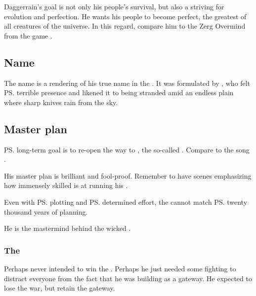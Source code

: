 Daggerrain's goal is not only his people's survival, but also a striving for evolution and perfection. He wants his people to become perfect, the greatest of all creatures of the universe. In this regard, compare him to the Zerg Overmind from the game \cite{VideoGame:Starcraft}.









\subsection{Name}
The name \Daggerrain{} is a rendering of his true name in the . 
It was formulated by \Semiza, who felt \ps{\Daggerrain}{} terrible presence and likened it to being stranded amid an endless plain where sharp knives rain from the sky.  









\subsection{Master plan}
\ps{\Daggerrain}{} long-term goal is to re-open the way to \Erebos, the so-called . Compare to the song . 

His master plan is brilliant and fool-proof. Remember to have scenes emphasizing how immensely skilled \Daggerrain{} is at running his . 

Even with \ps{\HriistD}{} plotting and \ps{\Ishnaruchaefir} determined effort, the \dragons{} cannot match \ps{\Daggerrain}{} twenty thousand years of planning. 

He is the mastermind behind the wicked . 





\subsubsection{The \firstbanewar}
Perhaps \Daggerrain{} never intended to win the \firstbanewar. Perhaps he just needed some fighting to distract everyone from the fact that he was building \Nyx{} as a gateway. He expected to lose the war, but retain the gateway. 






